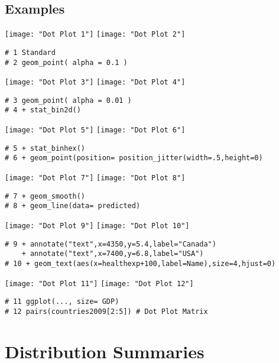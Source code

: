 \documentclass[]{article}
\begin{document}
\subsection{Examples}
\texttt{[image: "Dot Plot 1"]}
\texttt{[image: "Dot Plot 2"]}
\begin{verbatim}
# 1 Standard
# 2 geom_point( alpha = 0.1 )
\end{verbatim}

\texttt{[image: "Dot Plot 3"]}
\texttt{[image: "Dot Plot 4"]}
\begin{verbatim}
# 3 geom_point( alpha = 0.01 )
# 4 + stat_bin2d()
\end{verbatim}

\texttt{[image: "Dot Plot 5"]}
\texttt{[image: "Dot Plot 6"]}
\begin{verbatim}
# 5 + stat_binhex()
# 6 + geom_point(position= position_jitter(width=.5,height=0)
\end{verbatim}

\texttt{[image: "Dot Plot 7"]}
\texttt{[image: "Dot Plot 8"]}
\begin{verbatim}
# 7 + geom_smooth()
# 8 + geom_line(data= predicted)
\end{verbatim}

\texttt{[image: "Dot Plot 9"]}
\texttt{[image: "Dot Plot 10"]}
\begin{verbatim}
# 9 + annotate("text",x=4350,y=5.4,label="Canada") 
	+ annotate("text",x=7400,y=6.8,label="USA")
# 10 + geom_text(aes(x=healthexp+100,label=Name),size=4,hjust=0)
\end{verbatim}

\texttt{[image: "Dot Plot 11"]}
\texttt{[image: "Dot Plot 12"]}
\begin{verbatim}
# 11 ggplot(..., size= GDP) 
# 12 pairs(countries2009[2:5]) # Dot Plot Matrix
\end{verbatim}

\section{Distribution Summaries}
\end{document}
